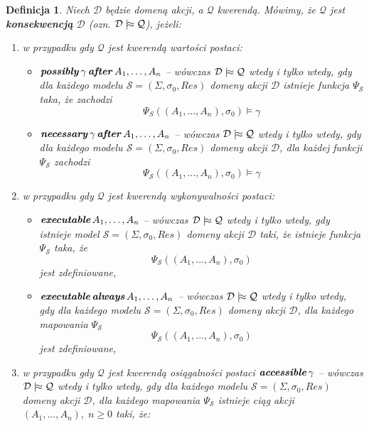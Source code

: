 \documentclass[11pt,a4paper]{article}
\newtheorem{defn}{Definicja}
\DeclareMathOperator{\After}{\textbf{\textit{after}}}
\DeclareMathOperator{\Always}{\textbf{\textit{always}}}
\DeclareMathOperator{\Executable}{\textbf{\textit{executable}}}
\DeclareMathOperator{\Accessible}{\textbf{\textit{accessible}}}
\DeclareMathOperator{\Possibly}{\textbf{\textit{possibly}}}
\DeclareMathOperator{\Necessary}{\textbf{\textit{necessary}}}
\def\consequence{\mathrel|\joinrel\approx}
\begin{document}
\begin{defn}
    Niech $\mathcal{D}$ będzie domeną akcji, a $\mathcal{Q}$ kwerendą. 
    Mówimy, że $\mathcal{Q}$ jest \textbf{konsekwencją} $\mathcal{D}$ (ozn. $\mathcal{D} \consequence \mathcal{Q}$), jeżeli:

    \begin{enumerate}
        \item w przypadku gdy $\mathcal{Q}$ jest kwerendą wartości postaci:
        \begin{itemize}
            \item $\Possibly \gamma \After A_1, \dots, A_n$ -- wówczas $\mathcal{D} \consequence \mathcal{Q}$ wtedy i tylko wtedy, gdy dla każdego modelu %
            $\mathcal{S} = (\Sigma,\sigma_0,Res)$ domeny akcji $\mathcal{D}$ istnieje funkcja $\Psi_\mathcal{S}$ taka, że zachodzi $$\Psi_S((A_1,...,A_n),\sigma_{0}) \models \gamma$$
            \item $\Necessary \gamma \After A_1, \dots, A_n$ -- wówczas $\mathcal{D} \consequence \mathcal{Q}$ wtedy i tylko wtedy, gdy dla każdego modelu %
            $\mathcal{S} = (\Sigma,\sigma_0,Res)$ domeny akcji $\mathcal{D}$, dla każdej funkcji $\Psi_\mathcal{S}$ zachodzi $$\Psi_\mathcal{S}((A_1,...,A_n),\sigma_{0}) \models \gamma$$
        \end{itemize}
        \item w przypadku gdy $\mathcal{Q}$ jest kwerendą wykonywalności postaci:
        \begin{itemize}
            \item $\Executable A_1, \dots, A_n$ -- wówczas $\mathcal{D} \consequence \mathcal{Q}$ wtedy i tylko wtedy, gdy istnieje model %
            $\mathcal{S} = (\Sigma,\sigma_0,Res)$ domeny akcji $\mathcal{D}$ taki, że istnieje %
            funkcja $\Psi_\mathcal{S}$ taka, że
            $$\Psi_\mathcal{S}((A_1,...,A_n),\sigma_{0})$$
            jest zdefiniowane,
            \item $\Executable \Always A_1, \dots, A_n$ -- wówczas $\mathcal{D} \consequence \mathcal{Q}$ wtedy i tylko wtedy, gdy dla każdego modelu %
            $\mathcal{S} = (\Sigma,\sigma_0,Res)$ domeny akcji $\mathcal{D}$, dla każdego mapowania $\Psi_\mathcal{S}$
            $$\Psi_\mathcal{S}((A_1,...,A_n),\sigma_{0})$$
            jest zdefiniowane,
        \end{itemize}
        \item w przypadku gdy $\mathcal{Q}$ jest kwerendą osiągalności postaci $\Accessible \gamma$ -- wówczas $\mathcal{D} \consequence \mathcal{Q}$ wtedy i tylko wtedy, gdy dla każdego modelu $\mathcal{S} = (\Sigma,\sigma_0,Res)$ domeny akcji $\mathcal{D}$, dla każdego mapowania $\Psi_\mathcal{S}$ istnieje ciąg akcji $(A_1,...,A_n), \; n \geq 0$ taki, że:

\end{enumerate}
\end{defn}
\end{document}
